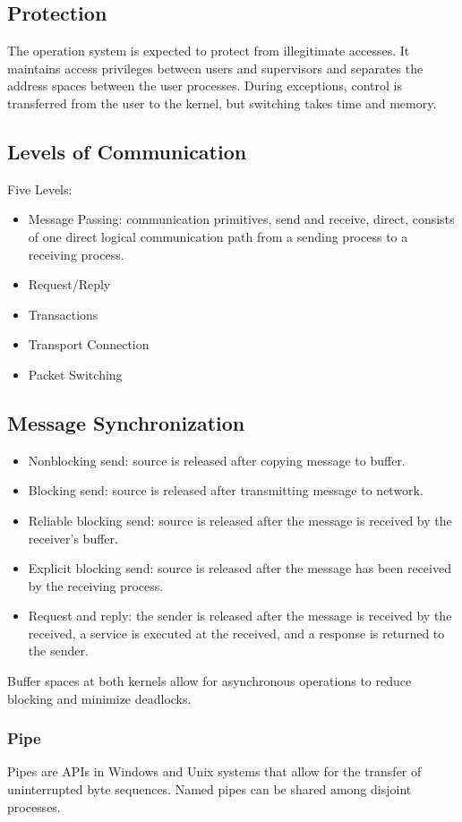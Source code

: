 \documentclass[letterpaper, 12pt]{math}
\begin{document}
\subsection*{Protection}
The operation system is expected to protect from illegitimate accesses. It
maintains access privileges between users and supervisors and separates the
address spaces between the user processes. During exceptions, control is
transferred from the user to the kernel, but switching takes time and memory.

\subsection*{Levels of Communication}
Five Levels:
\begin{itemize}
  \item Message Passing: communication primitives, send and receive, direct,
  consists of one direct logical communication path from a sending process to a
  receiving process.
  \item Request/Reply
  \item Transactions
  \item Transport Connection
  \item Packet Switching
\end{itemize}

\subsection*{Message Synchronization}
\begin{itemize}
  \item Nonblocking send: source is released after copying message to buffer.
  \item Blocking send: source is released after transmitting message to network.
  \item Reliable blocking send: source is released after the message is
  received by the receiver's buffer.
  \item Explicit blocking send: source is released after the message has been
  received by the receiving process.
  \item Request and reply: the sender is released after the message is received
  by the received, a service is executed at the received, and a response is
  returned to the sender.
\end{itemize}
Buffer spaces at both kernels allow for asynchronous operations to reduce
blocking and minimize deadlocks.

\subsubsection*{Pipe}
Pipes are APIs in Windows and Unix systems that allow for the transfer of
uninterrupted byte sequences. Named pipes can be shared among disjoint
processes.
\end{document}
